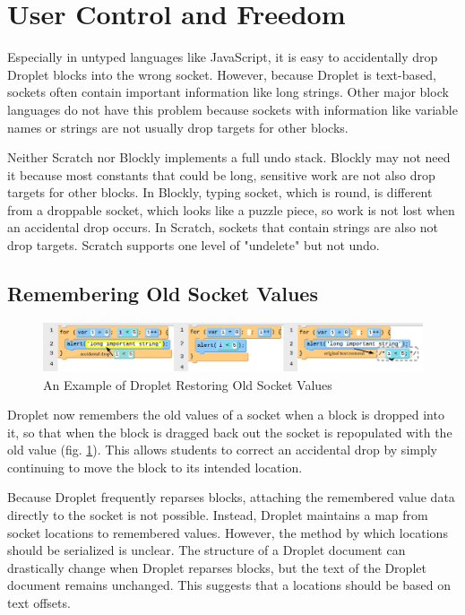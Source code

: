 \documentclass[conference]{IEEEtran}
\begin{document}
\section{User Control and Freedom}

Especially in untyped languages like JavaScript, it is easy to accidentally drop Droplet blocks into the wrong socket. However, because Droplet is text-based, sockets often contain important information like long strings. Other major block languages do not have this problem because sockets with information like variable names or strings are not usually drop targets for other blocks.

Neither Scratch nor Blockly implements a full undo stack. Blockly may not need it because most constants that could be long, sensitive work are not also drop targets for other blocks. In Blockly, typing socket, which is round, is different from a droppable socket, which looks like a puzzle piece, so work is not lost when an accidental drop occurs. In Scratch, sockets that contain strings are also not drop targets. Scratch supports one level of "undelete" but not undo.

\subsection{Remembering Old Socket Values}

\begin{figure}
\centering
\includegraphics[width=5in]{remember-socket.png}
\caption{An Example of Droplet Restoring Old Socket Values}
\label{remember-socket}
\end{figure}

Droplet now remembers the old values of a socket when a block is dropped into it, so that when the block is dragged back out the socket is repopulated with the old value (fig. \ref{remember-socket}). This allows students to correct an accidental drop by simply continuing to move the block to its intended location.

Because Droplet frequently reparses blocks, attaching the remembered value data directly to the socket is not possible. Instead, Droplet maintains a map from socket locations to remembered values. However, the method by which locations should be serialized is unclear. The structure of a Droplet document can drastically change when Droplet reparses blocks, but the text of the Droplet document remains unchanged. This suggests that a locations should be based on text offsets.
\end{document}

